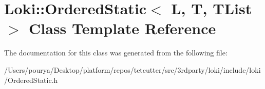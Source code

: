 \hypertarget{classLoki_1_1OrderedStatic}{}\section{Loki\+:\+:Ordered\+Static$<$ L, T, T\+List $>$ Class Template Reference}
\label{classLoki_1_1OrderedStatic}


The documentation for this class was generated from the following file\+:\begin{DoxyCompactItemize}
\item 
/\+Users/pourya/\+Desktop/platform/repos/tetcutter/src/3rdparty/loki/include/loki/Ordered\+Static.\+h\end{DoxyCompactItemize}
